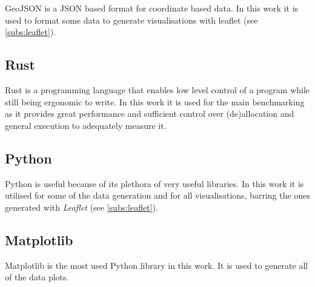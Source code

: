 GeoJSON\cite{geojson:2016} is a JSON\cite{json:2017} based format for coordinate based data. In this work it is used to format some data to generate visualisations with leaflet (see \autoref{subs:leaflet}).

\subsection{Rust}
\label{subs:rust}

Rust\cite{rust:2023} is a programming language that enables low level control of a program while still being ergonomic to write. In this work it is used for the main benchmarking as it provides great performance and sufficient control over (de)allocation and general execution to adequately measure it.

\subsection{Python}
\label{subs:python}

Python\cite{python:2023} is useful because of its plethora of very useful libraries. In this work it is utilised for some of the data generation and for all visualisations, barring the ones generated with \textit{Leaflet} (see \autoref{subs:leaflet}).

\subsection{Matplotlib}
\label{subs:matplotlib}

Matplotlib\cite{matplot:2023} is the most used Python library in this work. It is used to generate all of the data plots.